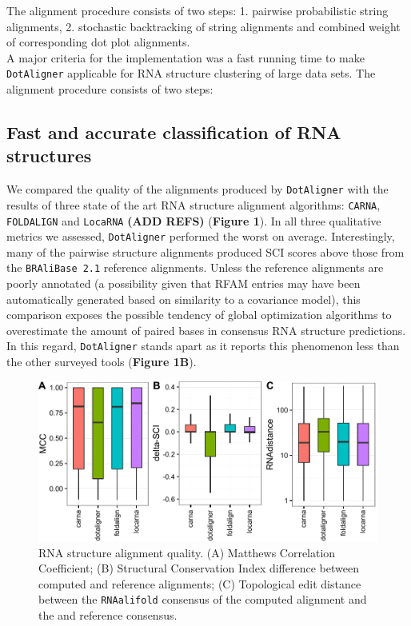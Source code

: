 \documentclass[a4paper,11pt]{article}
\newcommand\dotaligner{\texttt{DotAligner}}
\newcommand\bralibase{\texttt{BRAliBase 2.1}}
\newcommand\locarna{\texttt{LocaRNA}}
\newcommand\foldalign{\texttt{FOLDALIGN}}
\newcommand\carna{\texttt{CARNA}}
\newcommand\rnaalifold{\texttt{RNAalifold}}
\begin{document}
The alignment procedure consists of two steps: 
1. pairwise probabilistic string alignments,
2. stochastic backtracking of string alignments and combined weight 
of corresponding dot plot alignments.\\



A major criteria for the implementation was a fast
running time to make \dotaligner{} applicable for RNA structure clustering of
large data sets. The alignment procedure consists of two steps:



\subsection*{ Fast and accurate classification of RNA structures  } 
We compared the quality of the alignments produced by \dotaligner{} with the results of
three state of the art RNA structure alignment algorithms: \carna{}, \foldalign{} and \locarna{} \textbf{(ADD REFS)}
(\textbf{Figure 1}). In all three qualitative metrics we assessed,  \dotaligner{} performed the 
worst on average. Interestingly, many of the pairwise structure alignments produced 
SCI scores above those from the \bralibase{} reference alignments. Unless the reference
alignments are poorly annotated (a possibility given that RFAM entries may have been automatically 
generated based on similarity to a covariance model), this comparison exposes the possible 
tendency of global optimization algorithms to overestimate the amount of paired bases in 
consensus RNA structure predictions. In this regard, \dotaligner{} stands apart as it reports this 
phenomenon less than the other surveyed tools (\textbf{Figure 1B}). \\


\begin{figure}
 \includegraphics[width=\textwidth]{fig1}
 \caption {RNA structure alignment quality. (A) Matthews Correlation Coefficient; 
 (B) Structural Conservation Index difference between computed and reference alignments; 
 (C) Topological  edit distance between the \rnaalifold{} consensus of the computed alignment 
 and the and reference consensus.  }
\end{figure}
\end{document}
